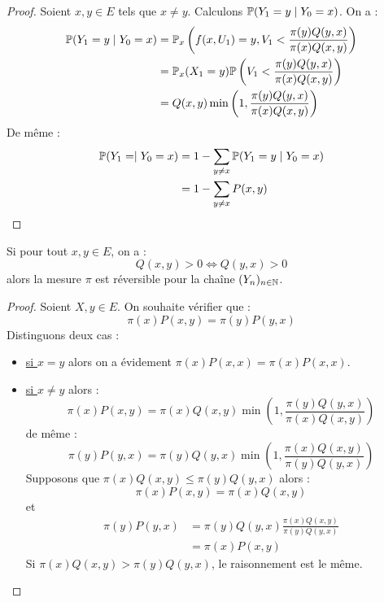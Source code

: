 \begin{proof}
    Soient $x,y \in E$ tels que $x \not = y$. Calculons $ \mathbb{P}(Y_1 = y \mid Y_0 = x)$. On a : 
        \begin{align*}
            \mathbb{P}( Y_1 = y \mid Y_0 = x) &= \mathbb{P}_x \left( f(x,U_1) = y, V_1 < \frac{ \pi(y) Q(y,x)}{ \pi(x) Q(x,y)} \right)  \\
            &= \mathbb{P}_x(X_1 = y) \mathbb{P} \left( V_1 < \frac{ \pi(y) Q(y,x)}{ \pi(x) Q(x,y)}\right) \\
            &= Q(x,y) \min \left( 1, \frac{ \pi(y) Q(y,x)}{ \pi(x) Q(x,y)} \right)
        \end{align*} 
    De même : 
        \begin{align*}
            \mathbb{P}(Y_1 = \mid Y_0 = x) &= 1 - \sum_{y \not = x} \mathbb{P}(Y_1 = y \mid Y_0 = x) \\
            &= 1 - \sum_{y \not = x} P(x,y)
        \end{align*}
\end{proof}

\begin{proposition}
    Si pour tout $x,y \in E$, on a : 
        $$ Q(x,y) > 0 \iff Q(y,x) > 0 $$ 
    alors la mesure $ \pi$ est réversible pour la chaîne $(Y_n)_{n \in \mathbb{N}}$. 
\end{proposition}

\begin{proof}
    Soient $X,y \in E$. On souhaite vérifier que : 
        $$ \pi(x)P(x,y) = \pi(y)P(y,x) $$ 
    Distinguons deux cas : 
    \begin{itemize}
        \item \underline{si $x = y$} alors on a évidement $\pi(x)P(x,x) = \pi(x)P(x,x)$. 
        \item \underline{si $x \not = y$} alors : 
            $$ \pi(x) P(x,y) = \pi(x) Q(x,y) \min \left(1, \frac{ \pi(y) Q(y,x)}{ \pi(x) Q(x,y)}  \right) $$ 
        de même : 
            $$ \pi(y) P(y,x) = \pi(y) Q(y,x) \min \left(1, \frac{ \pi(x) Q(x,y)}{ \pi(y) Q(y,x)}  \right) $$ 
        Supposons que $  \pi(x) Q(x,y) \leqslant \pi(y) Q(y,x)$ alors : 
            $$ \pi(x)P(x,y) = \pi(x) Q(x,y) $$ 
        et 
            \begin{align*}
                \pi(y) P(y,x) &= \pi(y) Q(y,x) \frac{ \pi(x) Q(x,y)}{ \pi(y) Q(y,x)} \\ 
                &= \pi(x) P(x,y) 
            \end{align*}
        Si $ \pi(x) Q(x,y) > \pi(y) Q(y,x) $, le raisonnement est le même.
    \end{itemize}
\end{proof}

